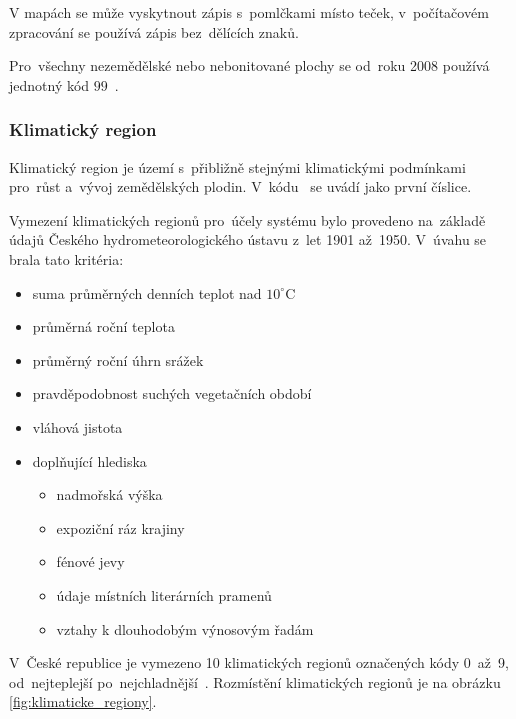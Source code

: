 V mapách se může vyskytnout zápis s~pomlčkami místo teček, v~počítačovém zpracování se používá zápis bez~dělících znaků.

Pro~všechny nezemědělské nebo nebonitované plochy se od~roku 2008 používá jednotný kód $99$~\citep{metodika_bpej}.

\subsubsection{Klimatický region}
\label{klimaticky_region}

Klimatický region je území s~přibližně stejnými klimatickými podmínkami pro~růst a~vývoj zemědělských plodin. V~kódu~ se uvádí jako první číslice.

Vymezení klimatických regionů pro~účely systému  bylo provedeno na~základě údajů Českého hydrometeorologického ústavu z~let 1901 až~1950. V~úvahu se brala tato kritéria:
	\begin{itemize}[leftmargin=1.5cm, noitemsep]
		\item suma průměrných denních teplot nad $10^\circ$C
		\item průměrná roční teplota
		\item průměrný roční úhrn srážek
		\item pravděpodobnost suchých vegetačních období
		\item vláhová jistota
		\item doplňující hlediska
			\begin{itemize}[leftmargin=1cm, noitemsep]
				\item nadmořská výška
				\item expoziční ráz krajiny
				\item fénové jevy
				\item údaje místních literárních pramenů
				\item vztahy k dlouhodobým výnosovým řadám
			\end{itemize}
	\end{itemize}

V~České republice je vymezeno 10 klimatických regionů označených kódy 0~až~9, od~nejteplejší po~nejchladnější~\citep{vyhlaska_327}. Rozmístění klimatických regionů je na obrázku \ref{fig:klimaticke_regiony}.

